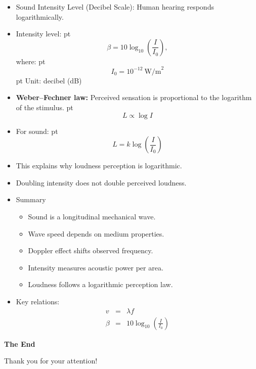 \documentclass[t,aspectratio=169]{beamer}
\begin{document}
\begin{frame}
\begin{itemize}
\pagebreak

\item Sound Intensity Level (Decibel Scale): Human hearing responds logarithmically.
\item Intensity level:
 pt
$$\beta = 10 \log_{10} \left(\frac{I}{I_0}\right),$$
where:
 pt
$$ I_0 = 10^{-12} \ \text{W/m}^2$$
 pt
Unit: decibel (dB)
\item \textbf{Weber--Fechner law:} Perceived sensation is proportional to the logarithm of the stimulus.
 pt
$$L \propto \log I$$
\item For sound:
 pt
$$ L = k \log \left(\frac{I}{I_0}\right) $$
\item This explains why loudness perception is logarithmic.
\item Doubling intensity does not double perceived loudness.

\pagebreak
\item Summary
\begin{itemize}
    \item Sound is a longitudinal mechanical wave.
    \item Wave speed depends on medium properties.
    \item Doppler effect shifts observed frequency.
    \item Intensity measures acoustic power per area.
    \item Loudness follows a logarithmic perception law.
\end{itemize}

\item Key relations:
\begin{eqnarray*}
v &=& \lambda f\\
\beta &=& 10 \log_{10}\left(\frac{I}{I_0}\right)
\end{eqnarray*}

\end{itemize}

\end{frame}


\begin{frame}

\vfill
\begin{center}
\textbf{\huge The End}

\bigskip
Thank you for your attention!
\end{center}
\vfill
\end{frame}
\end{document}
